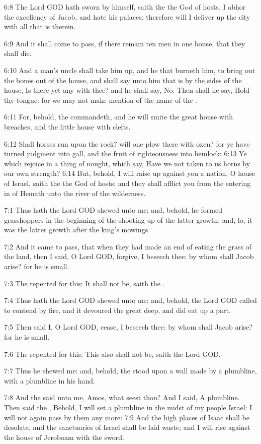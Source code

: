 6:8 The Lord GOD hath sworn by himself, saith the \LORD the God of
hosts, I abhor the excellency of Jacob, and hate his palaces:
therefore will I deliver up the city with all that is therein.

6:9 And it shall come to pass, if there remain ten men in one house,
that they shall die.

6:10 And a man's uncle shall take him up, and he that burneth him, to
bring out the bones out of the house, and shall say unto him that is
by the sides of the house, Is there yet any with thee? and he shall
say, No. Then shall he say, Hold thy tongue: for we may not make
mention of the name of the \LORD.

6:11 For, behold, the \LORD commandeth, and he will smite the great
house with breaches, and the little house with clefts.

6:12 Shall horses run upon the rock? will one plow there with oxen?
for ye have turned judgment into gall, and the fruit of righteousness
into hemlock: 6:13 Ye which rejoice in a thing of nought, which say,
Have we not taken to us horns by our own strength?  6:14 But, behold,
I will raise up against you a nation, O house of Israel, saith the
\LORD the God of hosts; and they shall afflict you from the entering in
of Hemath unto the river of the wilderness.

7:1 Thus hath the Lord GOD shewed unto me; and, behold, he formed
grasshoppers in the beginning of the shooting up of the latter growth;
and, lo, it was the latter growth after the king's mowings.

7:2 And it came to pass, that when they had made an end of eating the
grass of the land, then I said, O Lord GOD, forgive, I beseech thee:
by whom shall Jacob arise? for he is small.

7:3 The \LORD repented for this: It shall not be, saith the \LORD.

7:4 Thus hath the Lord GOD shewed unto me: and, behold, the Lord GOD
called to contend by fire, and it devoured the great deep, and did eat
up a part.

7:5 Then said I, O Lord GOD, cease, I beseech thee: by whom shall
Jacob arise? for he is small.

7:6 The \LORD repented for this: This also shall not be, saith the Lord
GOD.

7:7 Thus he shewed me: and, behold, the \LORD stood upon a wall made by
a plumbline, with a plumbline in his hand.

7:8 And the \LORD said unto me, Amos, what seest thou? And I said, A
plumbline. Then said the \LORD, Behold, I will set a plumbline in the
midst of my people Israel: I will not again pass by them any more: 7:9
And the high places of Isaac shall be desolate, and the sanctuaries of
Israel shall be laid waste; and I will rise against the house of
Jeroboam with the sword.

